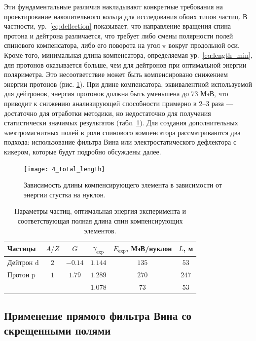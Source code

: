 \par Эти фундаментальные различия накладывают конкретные требования на проектирование накопительного кольца для исследования обоих типов частиц. В частности, ур.~\ref{eq:deflection} показывает, что направление вращения спина протона и дейтрона различается, что требует либо смены полярности полей спинового компенсатора, либо его поворота на угол $\pi$ вокруг продольной оси. Кроме того, минимальная длина компенсатора, определяемая ур.~\ref{eq:length_min}, для протонов оказывается больше, чем для дейтронов при оптимальной энергии поляриметра. Это несоответствие может быть компенсировано снижением энергии протонов (рис. \ref{fig:4_ele_length}). При длине компенсатора, эквивалентной используемой для дейтронов, энергия протонов должна быть уменьшена до 73 МэВ, что приводит к снижению анализирующей способности примерно в 2–3 раза — достаточно для отработки методики, но недостаточно для получения статистически значимых результатов (табл. \ref{tab:particles}). Для создания дополнительных электромагнитных полей в роли спинового компенсатора рассматриваются два подхода: использование фильтра Вина или электростатического дефлектора с кикером, которые будут подробно обсуждены далее.

\begin{figure}[!h]
	\centering
	\texttt{[image: 4\_total\_length]}
	\caption{Зависимость длины компенсирующего элемента в зависимости от энергии сгустка на нуклон.}
	\label{fig:4_ele_length}
\end{figure}

\begin{table}[!htb]

	\centering
	\caption{Параметры частиц, оптимальная энергия эксперимента и соответствующая полная длина спин компенсирующих элементов.}
	\label{tab:particles}
	\begin{tabular}{lccccc}
		\toprule
		Частицы & $A/Z$ & $G$     & $\gamma_{\text{exp}}$ & $E_{\text{exp}}$, МэВ/нуклон  & $L$, м \\
		\midrule
		Дейтрон $\text{d}$ & $2$   & $-0.14$ & $1.144$  & $135$ & $53$ \\
		Протон $\text{p}$ & $1$   & $1.79$  & $1.289$ & $270$ & $247$ \\
		&    &   & $1.078$ & $73$ & $53$ \\
		\bottomrule
	\end{tabular}
\end{table}

	\subsection{Применение прямого фильтра Вина со скрещенными полями}


